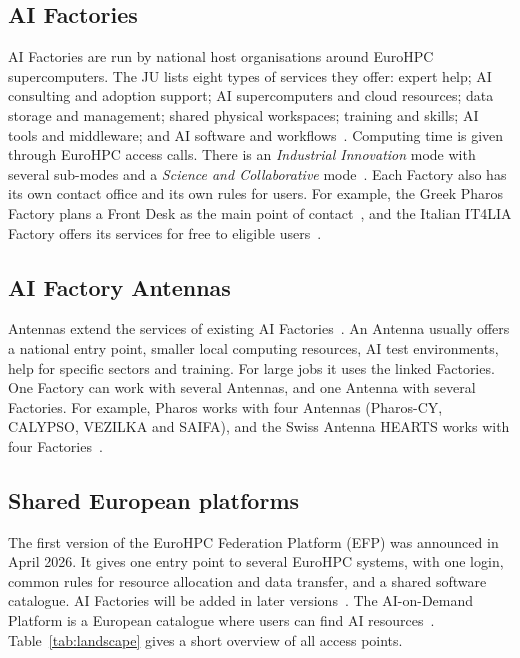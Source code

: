 \documentclass[conference,a4paper]{IEEEtran}
\begin{document}
\subsection{AI Factories}
AI Factories are run by national host organisations around EuroHPC supercomputers. The JU lists eight types of services they offer: expert help; AI consulting and adoption support; AI supercomputers and cloud resources; data storage and management; shared physical workspaces; training and skills; AI tools and middleware; and AI software and workflows~\cite{eurohpc_aif_services}. Computing time is given through EuroHPC access calls. There is an \emph{Industrial Innovation} mode with several sub-modes and a \emph{Science and Collaborative} mode~\cite{eurohpc_aif_access}. Each Factory also has its own contact office and its own rules for users. For example, the Greek Pharos Factory plans a Front Desk as the main point of contact~\cite{eurohpc_pharos}, and the Italian IT4LIA Factory offers its services for free to eligible users~\cite{eurohpc_it4lia}.

\subsection{AI Factory Antennas}
Antennas extend the services of existing AI Factories~\cite{eurohpc_antennas_page}. An Antenna usually offers a national entry point, smaller local computing resources, AI test environments, help for specific sectors and training. For large jobs it uses the linked Factories. One Factory can work with several Antennas, and one Antenna with several Factories. For example, Pharos works with four Antennas (Pharos-CY, CALYPSO, VEZILKA and SAIFA), and the Swiss Antenna HEARTS works with four Factories~\cite{eurohpc_antennas}.

\subsection{Shared European platforms}
The first version of the EuroHPC Federation Platform (EFP) was announced in April 2026. It gives one entry point to several EuroHPC systems, with one login, common rules for resource allocation and data transfer, and a shared software catalogue. AI Factories will be added in later versions~\cite{eurohpc_efp}. The AI-on-Demand Platform is a European catalogue where users can find AI resources~\cite{aiod}. Table~\ref{tab:landscape} gives a short overview of all access points.
\end{document}
